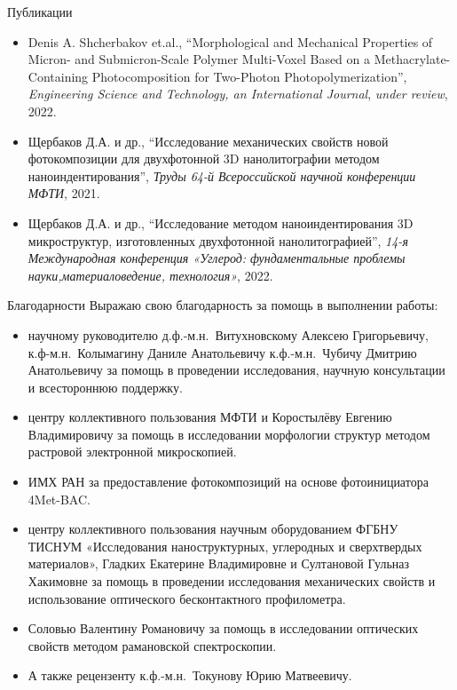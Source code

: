 \documentclass[aspectratio=169]{beamer}
\begin{document}
\begin{frame}{Публикации}
    \begin{itemize}
        \item Denis A. Shcherbakov et.al., “Morphological and Mechanical Properties of Micron- and Submicron-Scale Polymer Multi-Voxel Based on a Methacrylate-Containing Photocomposition for Two-Photon Photopolymerization”, \textit{Engineering Science and Technology, an International Journal}, \textit{under review}, 2022.
        \item Щербаков Д.А. и др., “Исследование механических свойств новой фотокомпозиции для двухфотонной 3D нанолитографии методом наноиндентирования”, \textit{Труды 64-й Всероссийской научной конференции МФТИ}, 2021.
        \item Щербаков Д.А. и др., “Исследование методом наноиндентирования 3D микроструктур, изготовленных двухфотонной нанолитографией”, \textit{14-я Международная конференция «Углерод: фундаментальные проблемы науки,материаловедение, технология»}, 2022.
    \end{itemize}
\end{frame}

\begin{frame}{Благодарности}
        \fontsize{11pt}{7.2}\selectfont
        Выражаю свою благодарность за помощь в выполнении работы:
        \begin{itemize}
            \item научному руководителю д.ф.-м.н.~Витухновскому Алексею Григорьевичу, к.ф-м.н.~Колымагину Даниле Анатольевичу к.ф.-м.н.~Чубичу Дмитрию Анатольевичу за помощь в проведении исследования, научную консультации и всестороннюю поддержку.
            \item центру коллективного пользования МФТИ и Коростылёву Евгению Владимировичу за помощь в исследовании морфологии структур методом растровой электронной микроскопией.
            \item ИМХ РАН за предоставление фотокомпозиций на основе фотоинициатора 4Met-BAC.
            \item центру коллективного пользования научным оборудованием ФГБНУ ТИСНУМ «Исследования наноструктурных, углеродных и сверхтвердых материалов», Гладких Екатерине Владимировне и Султановой Гульназ Хакимовне за помощь в проведении исследования механических свойств и использование оптического бесконтактного профилометра.
            \item Соловью Валентину Романовичу за помощь в исследовании оптических свойств методом рамановской спектроскопии.
            \item А также рецензенту к.ф.-м.н.~Токунову Юрию Матвеевичу.
        \end{itemize}
\end{frame}
\end{document}
